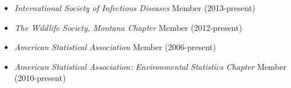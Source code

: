\documentclass[9pt]{article}
\newenvironment{outerlist}[1][\enskip\textbullet]%
        {\begin{itemize}[#1]}{\end{itemize}%
         }
\begin{document}
	\vspace{.15in}

\vspace{.15in}

  \begin{outerlist}
  \item[] \textit{International Society of Infectious Diseases} Member (2013-present)
	\item[] \textit{The Wildlife Society, Montana Chapter} Member (2012-present)
  
		\item[] \textit{American Statistical Association} Member (2006-present)
			
	\item[] \textit{American Statistical Association: Environmental Statistics Chapter} Member (2010-present)
	\end{outerlist}
\vspace{.15in}


\vspace{.15in}
\end{document}
